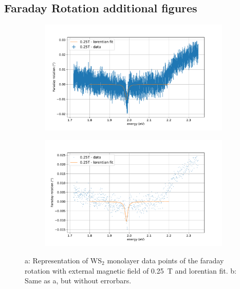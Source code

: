 \subsection{Faraday Rotation additional figures}
\label{sec:anhang:far}

\begin{figure}[H]
    \centering
    \begin{subfigure}{0.47\textwidth}
        \centering
        \includegraphics[width=1.0\textwidth]{plots/WS2_250mT.pdf}
    \caption{}
    \end{subfigure}
    \begin{subfigure}{0.47\textwidth}
        \centering
        \includegraphics[width=\textwidth]{plots/WS2_250mT_noerror.pdf}
        \caption{}
        \label{fig_WS2_250mT_noerror}
    \end{subfigure}
    \caption{a: Representation of WS$_2$ monolayer data points of the faraday rotation with external magnetic field of \SI{0.25}{\tesla} and lorentian fit. b: Same as a, but without errorbars.} %
\end{figure}

